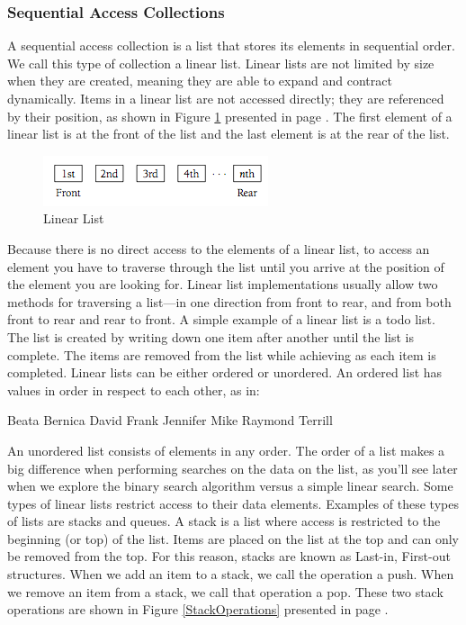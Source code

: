 \documentclass[12pt,a4paper,final,twoside,titlepage]{book}
\begin{document}
\subsubsection{Sequential Access Collections}
A sequential access collection is a list that stores its elements in sequential order. We call this type of collection a linear list. Linear lists are not limited by size when they are created, meaning they are able to expand and contract dynamically. Items in a linear list are not accessed directly; they are referenced by their position, as shown in Figure \ref{LinearList} presented in page \pageref{LinearList}. The first element of a linear list is at the front of the list and the last element is at the rear of the list.
\begin{figure}
\begin{center}
\includegraphics[scale=0.75]{LinearList}
\end{center}\caption{Linear List}
\label{LinearList}
\end{figure}
Because there is no direct access to the elements of a linear list, to access an element you have to traverse through the list until you arrive at the position of the element you are looking for. Linear list implementations usually allow two methods for traversing a list—in one direction from front to rear, and from both front to rear and rear to front.
A simple example of a linear list is a todo list. The list is created by writing down one item after another until the list is complete. The items are removed from the list while achieving as each item is completed.
Linear lists can be either ordered or unordered. An ordered list has values in order in respect to each other, as in:
\begin{center}
Beata Bernica David Frank Jennifer Mike Raymond Terrill
\end{center}
An unordered list consists of elements in any order. The order of a list makes a big difference when performing searches on the data on the list, as you’ll see later when we explore the binary search algorithm versus a simple linear search.
Some types of linear lists restrict access to their data elements. Examples of these types of lists are stacks and queues. A stack is a list where access is restricted to the beginning (or top) of the list. Items are placed on the list at the top and can only be removed from the top. For this reason, stacks are known as Last-in, First-out structures. When we add an item to a stack, we call the operation a push. When we remove an item from a stack, we call that operation a pop. These two stack operations are shown in Figure \ref{StackOperations} presented in page \pageref{StackOperations}.
\end{document}
